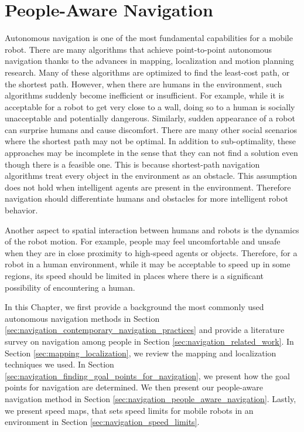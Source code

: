

\chapter{People-Aware Navigation}
\label{chapter:navigation_among_people}

Autonomous navigation is one of the most fundamental capabilities for a mobile robot. There are many algorithms that achieve point-to-point autonomous navigation thanks to the advances in mapping, localization and motion planning research. Many of these algorithms are optimized to find the least-cost path, or the shortest path. However, when there are humans in the environment, such algorithms suddenly become inefficient or insufficient. For example, while it is acceptable for a robot to get very close to a wall, doing so to a human is socially unacceptable and potentially dangerous. Similarly, sudden appearance of a robot can surprise humans and cause discomfort. There are many other social scenarios where the shortest path may not be optimal. In addition to sub-optimality, these approaches may be incomplete in the sense that they can not find a solution even though there is a feasible one. This is because shortest-path navigation algorithms treat every object in the environment as an obstacle. This assumption does not hold when intelligent agents are present in the environment. Therefore navigation should differentiate humans and obstacles for more intelligent robot behavior.

Another aspect to spatial interaction between humans and robots is the dynamics of the robot motion. For example, people may feel uncomfortable and unsafe when they are in close proximity to high-speed agents or objects. Therefore, for a robot in a human environment, while it may be acceptable to speed up in some regions, its speed should be limited in places where there is a significant possibility of encountering a human.

In this Chapter, we first provide a background the most commonly used autonomous navigation methods in Section \ref{sec:navigation_contemporary_navigation_practices} and provide a literature survey on navigation among people in Section \ref{sec:navigation_related_work}. In Section \ref{sec:mapping_localization}, we review the mapping and localization techniques we used. In Section \ref{sec:navigation_finding_goal_points_for_navigation}, we present how the goal points for navigation are determined. We then present our people-aware navigation method in Section \ref{sec:navigation_people_aware_navigation}. Lastly, we present speed maps, that sets speed limits for mobile robots in an environment in Section \ref{sec:navigation_speed_limits}.


